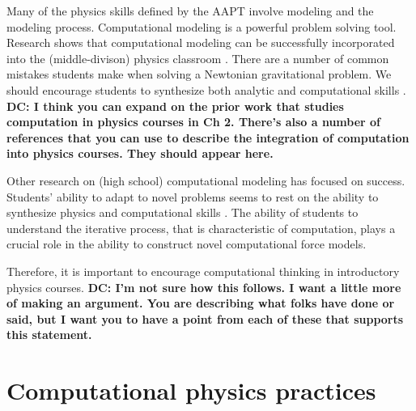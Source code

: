 \documentclass{msuphddissertation}
\begin{document}
\begin{doublespace}
Many of the physics skills defined by the AAPT involve modeling and the modeling process.  Computational modeling is a powerful problem solving tool.  Research shows that computational modeling can be successfully incorporated into the (middle-divison) physics classroom \cite{Caballero2011}.  There are a number of common mistakes students make when solving a Newtonian gravitational problem.  We should encourage students to synthesize both analytic and computational skills \cite{Caballero2014}. {\bf DC: I think you can expand on the prior work that studies computation in physics courses in Ch 2. There's also a number of references that you can use to describe the integration of computation into physics courses. They should appear here.}

Other research on (high school) computational modeling has focused on success.  Students' ability to adapt to novel problems seems to rest on the ability to synthesize physics and computational skills \cite{Aiken2012}.  The ability of students to understand the iterative process, that is characteristic of computation, plays a crucial role in the ability to construct novel computational force models.

Therefore, it is important to encourage computational thinking in introductory physics courses. {\bf DC: I'm not sure how this follows. I want a little more of making an argument. You are describing what folks have done or said, but I want you to have a point from each of these that supports this statement.}

\section{Computational physics practices}



\end{doublespace}
\end{document}
